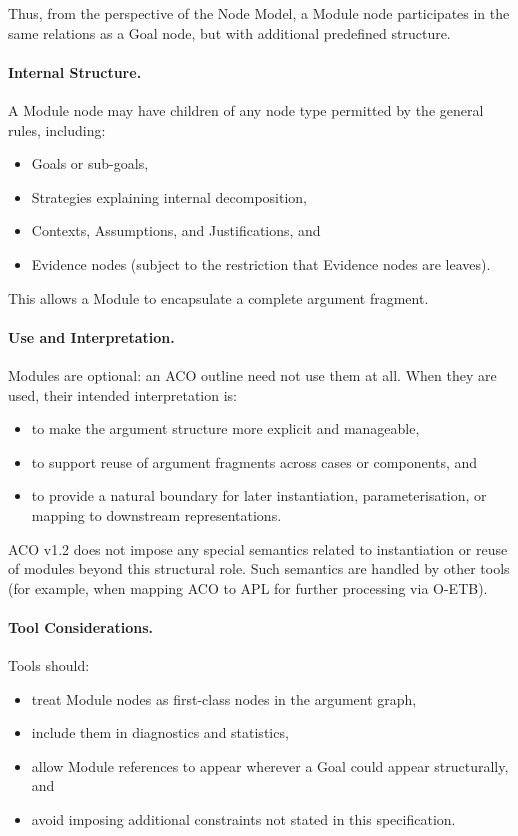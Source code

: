 \documentclass[11pt]{article}
\begin{document}
Thus, from the perspective of the Node Model, a Module node participates in the same
relations as a Goal node, but with additional predefined structure.

\paragraph{Internal Structure.}
A Module node may have children of any node type permitted by the general rules,
including:
\begin{itemize}[leftmargin=2em]
  \item Goals or sub-goals,
  \item Strategies explaining internal decomposition,
  \item Contexts, Assumptions, and Justifications, and
  \item Evidence nodes (subject to the restriction that Evidence nodes are leaves).
\end{itemize}

This allows a Module to encapsulate a complete argument fragment.

\paragraph{Use and Interpretation.}
Modules are optional: an ACO outline need not use them at all. When they are used,
their intended interpretation is:
\begin{itemize}[leftmargin=2em]
  \item to make the argument structure more explicit and manageable,
  \item to support reuse of argument fragments across cases or components, and
  \item to provide a natural boundary for later instantiation, parameterisation,
        or mapping to downstream representations.
\end{itemize}

ACO v1.2 does not impose any special semantics related to instantiation or reuse of modules
beyond this structural role. Such semantics are handled by other tools (for example,
when mapping ACO to APL for further processing via O-ETB).

\paragraph{Tool Considerations.}
Tools should:
\begin{itemize}[leftmargin=2em]
  \item treat Module nodes as first-class nodes in the argument graph,
  \item include them in diagnostics and statistics,
  \item allow Module references to appear wherever a Goal could appear structurally, and
  \item avoid imposing additional constraints not stated in this specification.
\end{itemize}
\end{document}
